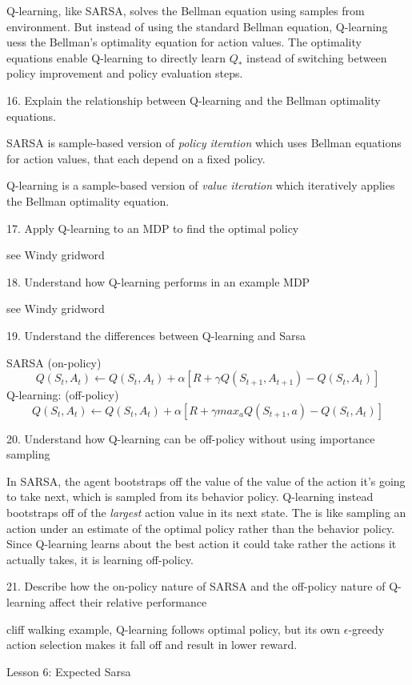 \documentclass[sutton_barto_notes.tex]{subfiles}
\begin{document}
Q-learning, like SARSA, solves the Bellman equation using samples from environment. But instead of using the standard Bellman equation, Q-learning uess the Bellman's optimality equation for action values. The optimality equations enable Q-learning to directly learn $Q_*$ instead of switching between policy improvement and policy evaluation steps.

16. Explain the relationship between Q-learning and the Bellman optimality equations.

SARSA is sample-based version of \textit{policy iteration} which uses Bellman equations for action values, that each depend on a fixed policy.

Q-learning is a sample-based version of \textit{value iteration} which iteratively applies the Bellman optimality equation.

17. Apply Q-learning to an MDP to find the optimal policy

see Windy gridword

18. Understand how Q-learning performs in an example MDP

see Windy gridword

19. Understand the differences between Q-learning and Sarsa

SARSA (on-policy)
$$ Q(S_t, A_t) \leftarrow Q(S_t, A_t) + \alpha [ R + \gamma Q( S_{t+1}, A_{t+1}) - Q(S_t, A_t)]$$
Q-learning: (off-policy)
$$Q(S_t,A_t)\leftarrow Q(S_t, A_t)+\alpha [R + \gamma max_a Q(S_{t+1}, a) - Q(S_t, A_t)]$$

20. Understand how Q-learning can be off-policy without using importance sampling

In SARSA, the agent bootstraps off the value of the value of the action it's going to take next, which is sampled from its behavior policy. Q-learning instead bootstraps off of the \textit{largest} action value in its next state. The is like sampling an action under an estimate of the optimal policy rather than the behavior policy. Since Q-learning learns about the best action it could take rather the actions it actually takes, it is learning off-policy.

21. Describe how the on-policy nature of SARSA and the off-policy nature of Q-learning affect their relative performance

cliff walking example, Q-learning follows optimal policy, but its own $\epsilon$-greedy action selection makes it fall off and result in lower reward.

Lesson 6: Expected Sarsa
\end{document}
